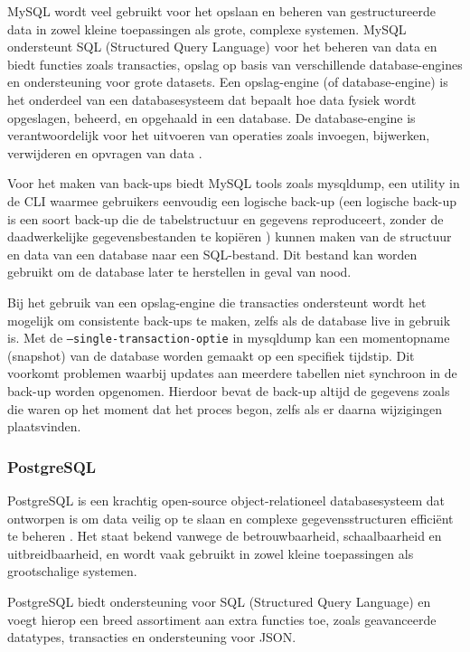 MySQL wordt veel gebruikt voor het opslaan en beheren van gestructureerde data in zowel kleine toepassingen als grote, complexe systemen. MySQL ondersteunt SQL (Structured Query Language) voor het beheren van data en biedt functies zoals transacties, opslag op basis van verschillende database-engines en ondersteuning voor grote datasets. Een opslag-engine (of database-engine) is het onderdeel van een databasesysteem dat bepaalt hoe data fysiek wordt opgeslagen, beheerd, en opgehaald in een database. De database-engine is verantwoordelijk voor het uitvoeren van operaties zoals invoegen, bijwerken, verwijderen en opvragen van data \autocite{Cabral2011}.

Voor het maken van back-ups biedt MySQL tools zoals mysqldump, een utility in de CLI waarmee gebruikers eenvoudig een logische back-up (een logische back-up is een soort back-up die de tabelstructuur en gegevens reproduceert, zonder de daadwerkelijke gegevensbestanden te kopiëren \autocite{MySQL}) kunnen maken van de structuur en data van een database naar een SQL-bestand. Dit bestand kan worden gebruikt om de database later te herstellen in geval van nood. 

Bij het gebruik van een opslag-engine die transacties ondersteunt wordt het mogelijk om consistente back-ups te maken, zelfs als de database live in gebruik is. Met de \texttt{--single-transaction-optie} in mysqldump kan een momentopname (snapshot) van de database worden gemaakt op een specifiek tijdstip. Dit voorkomt problemen waarbij updates aan meerdere tabellen niet synchroon in de back-up worden opgenomen. Hierdoor bevat de back-up altijd de gegevens zoals die waren op het moment dat het proces begon, zelfs als er daarna wijzigingen plaatsvinden.




\subsubsection{PostgreSQL}
PostgreSQL is een krachtig open-source object-relationeel databasesysteem dat ontworpen is om data veilig op te slaan en complexe gegevensstructuren efficiënt te beheren \autocite{Drake2002}. Het staat bekend vanwege de betrouwbaarheid, schaalbaarheid en uitbreidbaarheid, en wordt vaak gebruikt in zowel kleine toepassingen als grootschalige systemen.

PostgreSQL biedt ondersteuning voor SQL (Structured Query Language) en voegt hierop een breed assortiment aan extra functies toe, zoals geavanceerde datatypes, transacties en ondersteuning voor JSON.

